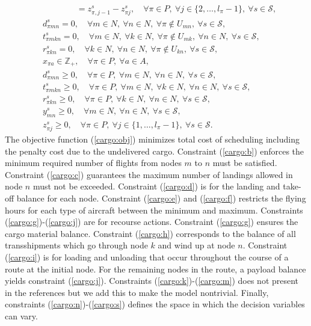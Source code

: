 \begin{subequations}
\begin{align}
	&\qquad\qquad=z_{\pi,j-1}^s - z_{\pi j}^s,\quad\forall\pi\in P,\ \forall j\in\{2,\ldots,l_\pi-1\},\ \forall s\in\mathcal{S},\label{cargo:j}\\
	&d_{\pi m n}^s = 0,\quad\forall m\in N,\ \forall n\in N,\ \forall \pi\notin U_{mn},\ \forall s\in\mathcal{S},\label{cargo:k}\\
	&t_{\pi m k n}^s = 0,\quad\forall m\in N,\ \forall k\in N,\ \forall \pi\notin U_{mk},\ \forall n\in N,\ \forall s\in\mathcal{S},\label{cargo:l}\\
	&r_{\pi k n}^s = 0,\quad\forall k\in N,\ \forall n\in N,\ \forall \pi\notin U_{kn},\ \forall s\in\mathcal{S},\label{cargo:m}\\
	&x_{\pi a}\in\mathbb{Z}_+,\quad\forall \pi\in P,\ \forall a\in A,\label{cargo:n}\\
	&d_{\pi m n}^s\ge 0,\quad\forall \pi\in P,\ \forall m\in N,\ \forall n\in N,\ \forall s\in\mathcal{S},\label{cargo:o}\\
	&t_{\pi mkn}^s\ge 0,\quad\forall \pi\in P,\ \forall m\in N,\ \forall k\in N,\ \forall n\in N,\ \forall s\in\mathcal{S},\label{cargo:p}\\
	&r_{\pi kn}^s\ge 0,\quad\forall \pi\in P,\ \forall k\in N,\ \forall n\in N,\ \forall s\in\mathcal{S},\label{cargo:q}\\
	&y_{mn}^s\ge 0,\quad\forall m\in N,\ \forall n\in N,\ \forall s\in\mathcal{S},\label{cargo:r}\\
	&z_{\pi j}^s\ge 0,\quad\forall\pi\in P,\ \forall j\in \{1,\ldots,l_\pi-1\},\ \forall s\in\mathcal{S}.\label{cargo:s}
	\end{align}
\end{subequations}
The objective function (\ref{cargo:obj}) minimizes total cost of scheduling including the penalty cost due to the undelivered cargo. Constraint (\ref{cargo:b}) enforces the minimum required number of flights from nodes $m$ to $n$ must be satisfied. Constraint (\ref{cargo:c}) guarantees the maximum number of landings allowed in node $n$ must not be exceeded. Constraint (\ref{cargo:d}) is for the landing and take-off balance for each node. Constraint (\ref{cargo:e}) and (\ref{cargo:f}) restricts the flying hours for each type of aircraft between the minimum and maximum. Constraints (\ref{cargo:g})-(\ref{cargo:j}) are for recourse actions. Constraint (\ref{cargo:g}) ensures the cargo material balance. Constraint (\ref{cargo:h}) corresponds to the balance of all transshipments which go through node $k$ and wind up at node $n$. Constraint (\ref{cargo:i}) is for loading and unloading that occur throughout the course of a route at the initial node. For the remaining nodes in the route, a payload balance yields constraint (\ref{cargo:j}). Constraints (\ref{cargo:k})-(\ref{cargo:m}) does not present in the references but we add this to make the model nontrivial. Finally, constraints (\ref{cargo:n})-(\ref{cargo:s}) defines the space in which the decision variables can vary.

